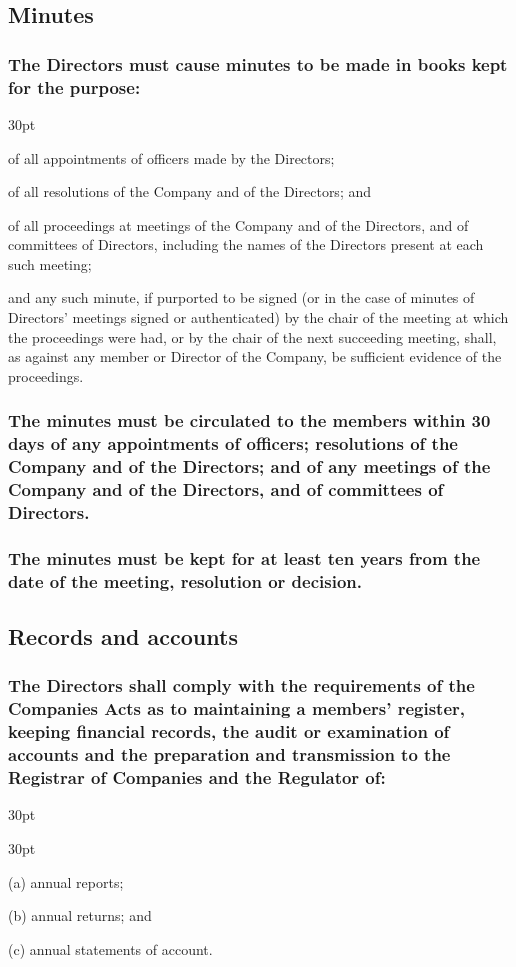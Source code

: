 \documentclass[12pt]{article}
\def\clauseindent{30pt}
\newenvironment{subindentpara}{\begin{adjustwidth}{\clauseindent}{}\begin{hanginglist}}{\end{hanginglist}\end{adjustwidth}}
\newenvironment{subindentlist}{\begin{adjustwidth}{\clauseindent}{}\begin{labeledlist}{\clauseindent}}{\end{labeledlist}\end{adjustwidth}}
\begin{document}
\subsection{\label{subsection:minutes}Minutes}
\subsubsection{The Directors must cause minutes to be made in books kept for the purpose:}
\begin{subindentpara}
    \item of all appointments of officers made by the Directors;
    \item of all resolutions of the Company and of the Directors; and
    \item of all proceedings at meetings of the Company and of the Directors, and of committees of Directors, including the names of the Directors present at each such meeting;
    \item and any such minute, if purported to be signed (or in the case of minutes of Directors' meetings signed or authenticated) by the chair of the meeting at which the proceedings were had, or by the chair of the next succeeding meeting, shall, as against any member or Director of the Company, be sufficient evidence of the proceedings.
\end{subindentpara}
\subsubsection{The minutes must be circulated to the members within 30 days of any appointments of officers; resolutions of the Company and of the Directors; and of any meetings of the Company and of the Directors, and of committees of Directors.}
\subsubsection{The minutes must be kept for at least ten years from the date of the meeting, resolution or decision.}

\subsection{Records and accounts}
\subsubsection{The Directors shall comply with the requirements of the Companies Acts as to maintaining a members' register, keeping financial records, the audit or examination of accounts and the preparation and transmission to the Registrar of Companies and the Regulator of:}
\begin{subindentlist}
    \item [(a)] annual reports;
    \item [(b)] annual returns; and
    \item [(c)] annual statements of account.
\end{subindentlist}
\end{document}
